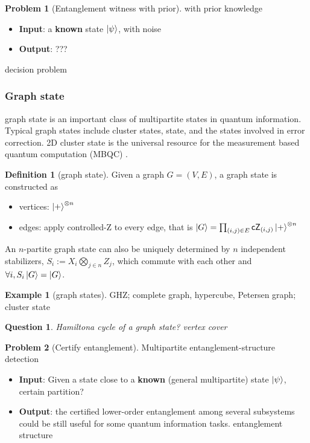 \documentclass[
aps,
pra,
linenumbers,
floatfix,
]{revtex4-2}
\theoremstyle{plain}
\newtheorem{question}{Question}
\theoremstyle{definition}
\newtheorem{definition}{Definition}
\newtheorem{example}{Example}
\newtheorem{problem}{Problem}
\begin{document}
\begin{problem}[Entanglement witness with prior]
	with prior knowledge
	\begin{itemize}
		\item \textbf{Input}: a \textbf{known} state $\ket{\psi}$, with noise
		\item \textbf{Output}: ???
	\end{itemize}
	decision problem
\end{problem}

\subsubsection{Graph state}
graph state is an important class of multipartite states in quantum information.
Typical graph states include cluster states,  state, and the states involved in error correction.
2D cluster state is the universal resource for the measurement based quantum computation (MBQC) \cite{briegelMeasurementbasedQuantumComputation2009}.
\begin{definition}[graph state]\label{def:graph_state}
	Given a graph $G=(V,E)$, a graph state is constructed as 
	\begin{itemize}
		\item vertices: $\ket{+}^{\otimes n}$
		\item edges: apply controlled-Z to every edge,
		that is $\ket{G}=\prod_{(i,j)\in E}\textsf{cZ}_{(i,j)} \ket{+}^{\otimes n}$
	\end{itemize}
	An $n$-partite graph state can also be uniquely determined by $n$ independent stabilizers, 
	$S_i:= X_i \bigotimes_{j\in n}Z_j$, 
	which commute with each other and $\forall i,S_i\ket{G}=\ket{G}$.
\end{definition}
\begin{example}[graph states]
	GHZ; complete graph, hypercube, Petersen graph; cluster state
\end{example}
\begin{question}
	Hamiltona cycle of a graph state? vertex cover
\end{question}
\begin{problem}[Certify entanglement]
	Multipartite entanglement-structure detection
	\begin{itemize}
		\item \textbf{Input}: Given a state close to a \textbf{known} (general multipartite) state $\ket{\psi}$,
		certain partition?
		\item \textbf{Output}: the certified lower-order entanglement among several subsystems could be still useful for some quantum information tasks.
		entanglement structure
	\end{itemize}
\end{problem}
\end{document}
